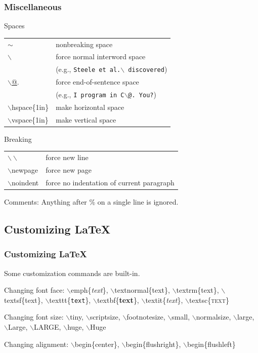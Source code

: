 \documentclass[ignorenonframetext]{beamer}
\begin{document}
\begin{frame}
  \frametitle{Miscellaneous}
  \begin{block}{Spaces}
    \begin{tabular}{l l}
      $\sim$ & nonbreaking space\\
      $\backslash$\ \null & force normal interword space\\
      & \quad(e.g., \texttt{Steele et al.$\backslash$ discovered})\\
      $\backslash$\url{@}. & force end-of-sentence space\\
      & \quad(e.g., \texttt{I program in C$\backslash$\url{@}\@. You?})\\
      $\backslash$hspace\{1in\} & make horizontal space\\
      $\backslash$vspace\{1in\} & make vertical space
    \end{tabular}
  \end{block}
  \begin{block}{Breaking}
    \begin{tabular}{l l}
      $\backslash\backslash$ & force new line\\
      $\backslash$newpage & force new page\\
      $\backslash$noindent & force no indentation of current paragraph
    \end{tabular}
  \end{block}
  Comments: Anything after \% on a single line is ignored.
\end{frame}


\subsection{Customizing \LaTeX}
\begin{frame}
  \frametitle{Customizing \LaTeX}
  Some customization commands are built-in.
  \begin{block}{Changing font face:}
    $\backslash$emph\{\emph{text}\},
    $\backslash$textnormal\{\textnormal{text}\},
    $\backslash$textrm\{\textrm{text}\},
    $\backslash$textsf\{\textsf{text}\},
    $\backslash$texttt\{\texttt{text}\},
    $\backslash$textbf\{\textbf{text}\},
    $\backslash$textit\{\textit{text}\},
    $\backslash$textsc\{\textsc{text}\}
  \end{block}
  \begin{block}{Changing font size:}
    \tiny$\backslash$tiny\normalsize,
    \scriptsize$\backslash$scriptsize\normalsize,
    \footnotesize$\backslash$footnotesize\normalsize,
    \small$\backslash$small\normalsize,
    \normalsize$\backslash$normalsize\normalsize,
    \large$\backslash$large\normalsize,
    \Large$\backslash$Large\normalsize,
    \LARGE$\backslash$LARGE\normalsize,
    \huge$\backslash$huge\normalsize,
    \Huge$\backslash$Huge\normalsize
  \end{block}
  \begin{block}{Changing alignment:}
    $\backslash$begin\{center\},
    $\backslash$begin\{flushright\},
    $\backslash$begin\{flushleft\}
  \end{block}
\end{frame}
\end{document}
